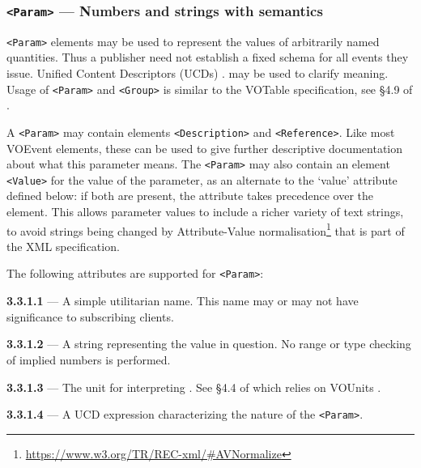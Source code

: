 \documentclass[11pt,a4paper]{ivoa}
\begin{document}
\subsubsection{\texttt{<Param>} --- Numbers and strings with semantics}
\label{sec:3.3.1}
\verb|<Param>| elements may be used to represent the values of arbitrarily named
quantities. Thus a publisher need not establish a fixed schema for all events
they issue. Unified Content Descriptors (UCDs) \citep{2018ivoa.spec.0527P}.
may be used to clarify meaning. Usage of \verb|<Param>| and \verb|<Group>| is
similar to the VOTable specification, see \S4.9 of \citep{2019ivoa.spec.1021O}.

A \verb|<Param>| may contain elements \verb|<Description>| and \verb|<Reference>|.
Like most VOEvent elements, these can be used to give further descriptive
documentation about what this parameter means. The \verb|<Param>| may also
contain an element \verb|<Value>| for the value of the parameter, as an alternate
to the `value' attribute defined below: if both are present, the attribute takes
precedence over the element. This allows parameter values to include a richer
variety of text strings, to avoid strings being changed by Attribute-Value
normalisation\footnote{\url{https://www.w3.org/TR/REC-xml/\#AVNormalize}} that
is part of the XML specification.

The following attributes are supported for \verb|<Param>|:

\noindent \textbf{3.3.1.1} \label{sec:3.3.1.1} --- A simple utilitarian
name. This name may or may not have significance to subscribing clients.

\noindent \textbf{3.3.1.2} \label{sec:3.3.1.2} --- A string representing
the value in question. No range or type checking of implied numbers is
performed.

\noindent \textbf{3.3.1.3} \label{sec:3.3.1.3} --- The unit for
interpreting . See \S4.4 of \citep{2019ivoa.spec.1021O}
which relies on VOUnits \citep{2023ivoa.spec.1215G}.

\noindent \textbf{3.3.1.4} \label{sec:3.3.1.4} --- A UCD
\citep{2018ivoa.spec.0527P}
expression characterizing the nature of the \verb|<Param>|.
\end{document}
